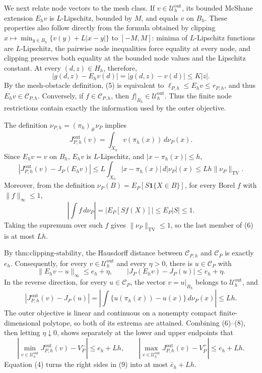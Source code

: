 We next relate node vectors to the mesh class. If \(v\in\mathcal U_h^{\mathrm{out}}\), its bounded McShane extension \(E_hv\) is \(L\)-Lipschitz, bounded by \(M\), and equals \(v\) on \(B_h\). These properties also follow directly from the formula obtained by clipping
\(
 x\mapsto\min_{y\in B_h}\{v(y)+L|x-y|\}
\)
to \([-M,M]\): minima of \(L\)-Lipschitz functions are \(L\)-Lipschitz, the pairwise node inequalities force equality at every node, and clipping preserves both equality at the bounded node values and the Lipschitz constant. At every \((d,z)\in H_h\), therefore,
\[
 |g(d,z)-E_hv(d)|=|g(d,z)-v(d)|\leq K|z|.                         \tag{5}
\]
By the mesh-obstacle definition, (5) is equivalent to
\(
 \ell_{P,h}\leq E_hv\leq r_{P,h}
\), and thus \(E_hv\in\mathcal C_{P,h}\). Conversely, if \(f\in\mathcal C_{P,h}\), then \(f|_{B_h}\in\mathcal U_h^{\mathrm{out}}\). Thus the finite node restrictions contain exactly the information used by the outer objective.

The definition \(\nu_{P,h}=(\pi_h)_\#\nu_P\) implies
\[
 J_{P,h}^{\mathrm{out}}(v)
 =\int_{X_0}v(\pi_h(x))\,d\nu_P(x).
\]
Since \(E_hv=v\) on \(B_h\), \(E_hv\) is \(L\)-Lipschitz, and \(|x-\pi_h(x)|\leq h\),
\[
 \left|J_{P,h}^{\mathrm{out}}(v)-J_P(E_hv)\right|
 \leq L\int_{X_0}|x-\pi_h(x)|\,d|\nu_P|(x)
 \leq Lh\|\nu_P\|_{\mathrm{TV}}.                               \tag{6}
\]
Moreover, from the definition \(\nu_P(B)=E_P[S\mathbf 1\{X\in B\}]\), for every Borel \(f\) with \(\|f\|_\infty\leq1\),
\[
 \left|\int f\,d\nu_P\right|=|E_P[Sf(X)]|\leq E_P|S|\leq1.
\]
Taking the supremum over such \(f\) gives \(\|\nu_P\|_{\mathrm{TV}}\leq1\), so the last member of (6) is at most \(Lh\).

By \(\text{thm:clipping-stability}\), the Hausdorff distance between \(\mathcal C_{P,h}\) and \(\mathcal C_P\) is exactly \(e_h\). Consequently, for every \(v\in\mathcal U_h^{\mathrm{out}}\) and every \(\eta>0\), there is \(u\in\mathcal C_P\) with
\[
 \|E_hv-u\|_\infty\leq e_h+\eta,
 \qquad
 |J_P(E_hv)-J_P(u)|\leq e_h+\eta.                                \tag{7}
\]
In the reverse direction, for every \(u\in\mathcal C_P\), the vector \(v=u|_{B_h}\) belongs to \(\mathcal U_h^{\mathrm{out}}\), and
\[
 |J_{P,h}^{\mathrm{out}}(v)-J_P(u)|
 =\left|\int\{u(\pi_h(x))-u(x)\}\,d\nu_P(x)\right|
 \leq Lh.                                                         \tag{8}
\]
The outer objective is linear and continuous on a nonempty compact finite-dimensional polytope, so both of its extrema are attained. Combining (6)--(8), then letting \(\eta\downarrow0\), shows separately at the lower and upper endpoints that
\[
 \left|\min_{v\in\mathcal U_h^{\mathrm{out}}}J_{P,h}^{\mathrm{out}}(v)-V_P^-\right|
 \leq e_h+Lh,
 \qquad
 \left|\max_{v\in\mathcal U_h^{\mathrm{out}}}J_{P,h}^{\mathrm{out}}(v)-V_P^+\right|
 \leq e_h+Lh.                                                    \tag{9}
\]
Equation (4) turns the right sides in (9) into at most \(\bar e_h+Lh\).

